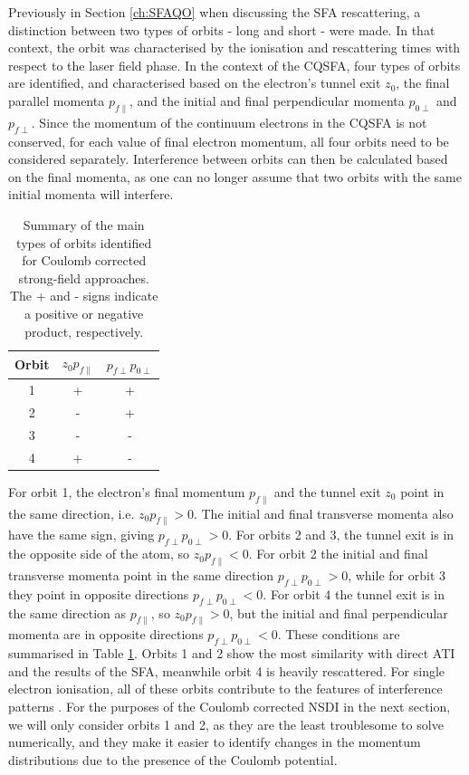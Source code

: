 \documentclass[11pt]{article}
\numberwithin{equation}{section}
\begin{document}
Previously in Section \ref{ch:SFAQO} when discussing the SFA rescattering, a distinction between two types of orbits - long and short - were made. In that context, the orbit was characterised by the ionisation and rescattering times with respect to the laser field phase. In the context of the CQSFA, four types of orbits are identified, and characterised based on the electron's tunnel exit $z_0$, the final parallel momenta $p_{f\parallel}$, and the initial and final perpendicular momenta $p_{0\perp}$ and $p_{f\perp}$\cite{yan_2010_lowenergy}. Since the momentum of the continuum electrons in the CQSFA is not conserved, for each value of final electron momentum, all four orbits need to be considered separately. Interference between orbits can then be calculated based on the final momenta, as one can no longer assume that two orbits with the same initial momenta will interfere.
\begin{table}[h!]
\centering
\begin{tabular}{||c c c||} 
 \hline
 Orbit & $z_0p_{f\parallel}$ & $p_{f\perp}p_{0\perp}$ \\ [0.5ex] 
 \hline\hline
 1 & + & + \\ 
 2 & - & + \\
 3 & - & - \\
 4 & + & - \\ [1ex] 
 \hline
\end{tabular}
\caption{Summary of the main types of orbits identified for Coulomb corrected strong-field approaches. The + and - signs indicate a positive or negative product, respectively.}
\label{table:1}
\end{table}
\newline
For orbit 1, the electron's final momentum $p_{f\parallel}$ and the tunnel exit $z_0$ point in the same direction, i.e. $z_0p_{f\parallel} > 0$. The initial and final transverse momenta also have the same sign, giving $p_{f\perp}p_{0\perp} > 0$.
For orbits 2 and 3, the tunnel exit is in the opposite side of the atom, so $z_0p_{f\parallel} < 0$. For orbit 2 the initial and final transverse momenta point in the same direction $p_{f\perp}p_{0\perp} > 0$, while for orbit 3 they point in opposite directions $p_{f\perp}p_{0\perp} < 0$. For orbit 4 the tunnel exit is in the same direction as $p_{f\parallel}$, so $z_0p_{f\parallel} > 0$, but the initial and final perpendicular momenta are in opposite directions $p_{f\perp}p_{0\perp} < 0$. These conditions are summarised in Table \ref{table:1}. 
Orbits 1 and 2 show the most similarity with direct ATI and the results of the SFA, meanwhile orbit 4 is heavily rescattered. For single electron ionisation, all of these orbits contribute to the features of interference patterns\cite{maxwell_2017_analytic} \cite{lai_2015_influence}. For the purposes of the Coulomb corrected NSDI in the next section, we will only consider orbits 1 and 2, as they are the least troublesome to solve numerically, and they make it easier to identify changes in the momentum distributions due to the presence of the Coulomb potential.
\end{document}
